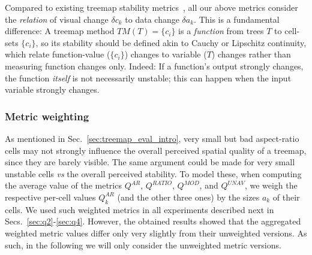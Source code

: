 \noindent Compared to existing treemap stability metrics~\citep{ordered,hahn10,hilbert_moore,sondag17}, all our above metrics consider the \emph{relation} of visual change $\delta c_k$ to data change $\delta a_k$. This is a fundamental difference: A treemap method $TM(T) = \{c_i\}$ is a \emph{function} from trees $T$ to cell-sets $\{c_i\}$, so its stability should be defined akin to Cauchy or Lipschitz continuity, which relate function-value ($\{c_i\}$) changes to variable ($T$) changes rather than measuring function changes only. Indeed: If a function's output strongly changes, the function \emph{itself} is not necessarily unstable; this can happen when the input variable strongly changes.

\subsubsection{Metric weighting}
%
As mentioned in Sec.~\ref{sec:treemap_eval_intro}, very small but bad aspect-ratio cells may not strongly influence the overall perceived spatial quality of a treemap, since they are barely visible. The same argument could be made for very small unstable cells \emph{vs} the overall perceived stability. To model these, when computing the average value of the metrics $Q^{AR}$, $Q^{RATIO}$, $Q^{MOD}$, and $Q^{UNAV}$, we weigh the respective per-cell values $Q^{AR}_k$ (and the other three ones) by the sizes $a_k$ of their cells. We used such weighted metrics in all experiments described next in Secs.~\ref{sec:q2}-\ref{sec:q4}. However, the obtained results showed that the aggregated weighted metric values differ only very slightly from their unweighted versions. As such, in the following we will only consider the unweighted metric versions.


